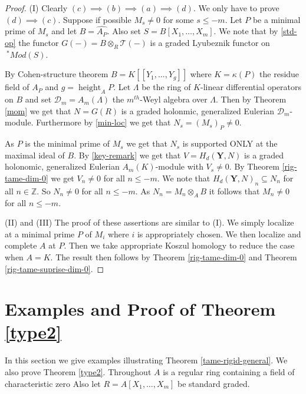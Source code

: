 \documentclass{amsart}
\newcommand{\ZZ}{\mathbb{Z} }
\newcommand{\D}{\mathcal{D} }
\newcommand{\bY}{\mathbf{Y} }
\newcommand{\FF}{\mathcal{T}}
\newcommand{\height}{\operatorname{height}}
\theoremstyle{plain}
\theoremstyle{definition}
\theoremstyle{remark}
\begin{document}
\begin{proof}
(I) Clearly $(c) \implies (b) \implies (a) \implies (d)$. We only have to prove
 $(d) \implies (c)$.
 Suppose if possible $M_s \neq 0$ for some $s \leq -m$. Let $P$ be a minimal prime of $M_s$ and let $B = \widehat{A_P}$. Also 
 set $S = B[X_1,\ldots, X_m]$.
 We note that by \ref{std-op} the functor $G(-) = B \otimes_R \FF(-)$ is a graded Lyubeznik functor on $ \ ^* Mod(S)$.
 
 By Cohen-structure theorem $B = K[[Y_1,\ldots, Y_g]]$ where $K = \kappa(P)$ the residue field of $A_P$  and $g = \height_A P$.
 Let $\Lambda $ be the ring of $K$-linear differential operators on $B$ and set $\D_m = A_m(\Lambda)$ the $m^{th}$-Weyl algebra
 over $\Lambda$. Then by  Theorem \ref{mom} we get that $N = G(R)$ is a graded holonmic, generalized Eulerian
 $\D_m$-module.  Furthermore by \ref{min-loc} we get that 
 $N_{s} = (M_{s})_P \neq 0$. 
 
 As $P$ is the minimal prime of $M_{s}$ we get that $N_s$ is supported  ONLY at the maximal ideal of $B$.
 By \ref{key-remark} we get that
 $V = H_d(\bY, N)$ is a graded holonomic, generalized Eulerian $A_m(K)$-module with $V_{s} \neq 0$. 
 By Theorem \ref{rig-tame-dim-0} we get  $V_n \neq 0$ for all $n \leq -m$.
 We note that $H_d(\bY, N)_n \subseteq N_n$ for all $n \in \ZZ$. So $N_n \neq 0$ for all 
 $n \leq -m$. As $N_n = M_n \otimes_A B$ it follows that $M_n \neq 0$ for all 
 $n \leq -m$.
 
 (II) and (III) The proof of these assertions are similar to (I). We simply localize at a minimal prime $P$ of $M_i$  where $i$ is appropriately  chosen.
 We then localize and complete $A$ at $P$. Then we take appropriate Koszul homology to reduce the case when $A = K$. The result then follows by Theorem \ref{rig-tame-dim-0} and Theorem \ref{rig-tame-suprise-dim-0}.
\end{proof}



\section{Examples and Proof of Theorem \ref{type2}}
In this section we give examples illustrating Theorem \ref{tame-rigid-general}. We also prove Theorem \ref{type2}.
Throughout $A$ is a regular ring containing a field of characteristic zero 
Also let $R = A[X_1, \ldots, X_m]$ be standard graded.
\end{document}
